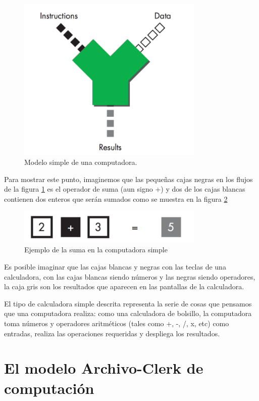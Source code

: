 \documentclass[12pt]{book}
\theoremstyle{definition}
\theoremstyle{remark}
\theoremstyle{plain}
\begin{document}
 \begin{figure}
\centering
\includegraphics[width=3.5in]{compu_modelo1.png}
\caption{Modelo simple de una computadora.}
\label{fig100}
\end{figure}
 
Para mostrar este punto, imaginemos que las pequeñas cajas negras en los flujos de la figura \ref{fig100} es el operador de suma (aun signo +) y dos de los cajas blancas contienen dos enteros que serán sumados como se muestra en la figura \ref{fig101}

 \begin{figure}
\centering
\includegraphics[width=3.5in]{suma.png}
\caption{Ejemplo de la suma en la computadora simple}
\label{fig101}
\end{figure}


Es posible imaginar que las cajas blancas y negras con las teclas de una calculadora, con las cajas blancas siendo números y las negras siendo operadores, la caja gris son los resultados que aparecen en las pantallas de la calculadora.

El tipo de calculadora simple descrita representa la serie de cosas que pensamos que una computadora realiza: como una calculadora de bolsillo, la computadora toma números y operadores aritméticos (tales como +, -, /, x, etc) como entradas, realiza las operaciones requeridas y despliega los resultados.

\section{El modelo Archivo-Clerk de computación}
\end{document}
